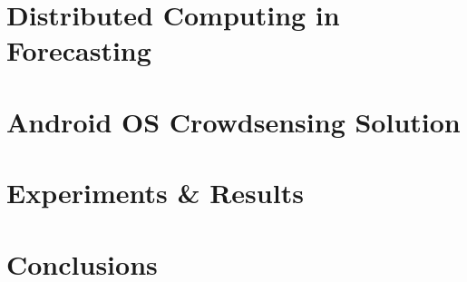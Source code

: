 \documentclass[runningheads]{llncs}
\begin{document}
\section{Distributed Computing in Forecasting}
%
\section{Android OS Crowdsensing Solution}
%
\section{Experiments \& Results}
%
\section{Conclusions}
%
%
%
% 
% 
%
\end{document}
